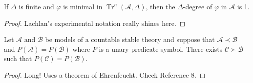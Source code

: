 \documentclass{article}
\DeclareMathOperator{\Tr}{Tr}
\let\mc\mathcal
\begin{document}
\begin{lemma}
    If $\Delta$ is finite and $\varphi$ is minimal in $\Tr^n(\mc{A}, \Delta)$, then the $\Delta$-degree of $\varphi$ in $\mc{A}$ is 1.
\end{lemma}
\begin{proof}
    Lachlan's experimental notation really shines here.
\end{proof}

\begin{theorem}
    Let $\mc{A}$ and $\mc{B}$ be models of a countable stable theory and suppose that $\mc{A} \prec \mc{B}$ and $P(\mc{A}) = P(\mc{B})$ where $P$ is a unary predicate symbol. There exists $\mc{C} \succ \mc{B}$ such that $P(\mc{C}) = P(\mc{B})$.
\end{theorem}
\begin{proof}
    Long! Uses a theorem of Ehrenfeucht. Check Reference 8.
\end{proof}
\end{document}
